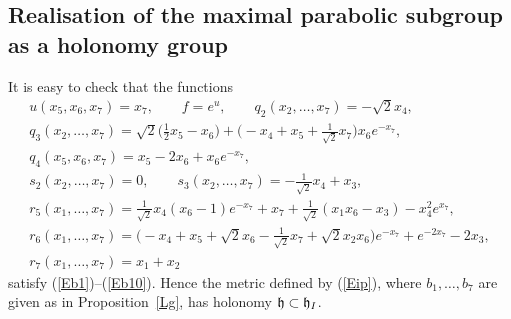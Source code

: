 \documentclass[pdftex]{sigma}
\numberwithin{equation}{section}
\newcommand\fh{{\frak h}}
\begin{document}
 \subsection{Realisation of the maximal parabolic subgroup as a holonomy group}\label{S3.2}
 It is easy to check that the functions
 \begin{gather*}
 u(x_5,x_6,x_7)=x_7,\qquad f=e^u,\qquad q_2(x_2,\dots,x_7) = -\sqrt 2x_4,\\
 q_3(x_2,\dots,x_7)= \sqrt 2\big(\tfrac12 x_5-x_6\big)+ \big( {-}x_4 +x_5+\tfrac 1{\sqrt 2}x_7 \big)x_6e^{-x_7},\\
 q_4(x_5,x_6,x_7)=x_5-2x_6+x_6e^{-x_7},\\
 s_2(x_2,\dots,x_7) =0,\qquad
 s_3(x_2,\dots,x_7) =-\tfrac1{\sqrt 2}x_4 +x_3 ,\\
 r_5(x_1,\dots,x_7) =\tfrac1{\sqrt 2} x_4(x_6-1)e^{-x_7} +x_7 + \tfrac1{\sqrt 2}(x_1 x_6 -x_3) -x_4^2 e^{x_7} ,\\
 r_6(x_1,\dots,x_7) =\big( {-}x_4+x_5+\sqrt2 x_6 -\tfrac1{\sqrt 2} x_7+\sqrt2 x_2 x_6 \big) e^{-x_7} + e^{-2x_7} -2x_3 ,\\
 r_7(x_1,\dots,x_7) = x_1+x_2
 \end{gather*}
 satisfy (\ref{Eb1})--(\ref{Eb10}). Hence the metric defined by (\ref{Eip}), where $b_1,\dots, b_7$ are given as in Proposition~\ref{Lg}, has holonomy $\fh\subset \fh_I$.
\end{document}
